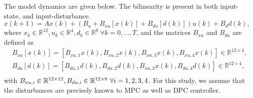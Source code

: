 The model dynamics are given below. The bilinearity is present in both input-state, and input-disturbance.
\begin{equation}\label{E:bilinear1}
x(k+1) = Ax(k)+(B_u +B_{xu}[x(k)] + B_{du}[d(k)]) u(k)+B_d d(k),
\end{equation}
where $x_{k} \in \mathbb{R}^{12}, u_{k} \in \mathbb{R}^{4}, d_{k} \in \mathbb{R}^{8} \ \forall k = 0,\dots,T$, and the matrices $B_{xu}$ and $B_{du}$ are defined as
\begin{equation}
	\begin{aligned}
		&B_{xu}[x(k)] = [ B_{xu,1}x(k),B_{xu,2}x(k), B_{xu,3}x(k), B_{xu,4}x(k) ] \in \mathbb{R}^{12\times4}, \\
		&B_{du}[d(k)] = [ B_{du,1}d(k),B_{du,2}d(k), B_{xu,3}x(k), B_{du,4}d(k) ] \in \mathbb{R}^{12\times4}, \\
	\end{aligned}
\end{equation}
with $B_{xu,i} \in \mathbb{R}^{12\times12}, B_{du,i} \in \mathbb{R}^{12\times8} \ \forall i=1,2,3,4$.
For this study, we assume that the disturbances are precisely known to MPC as well as DPC controller.